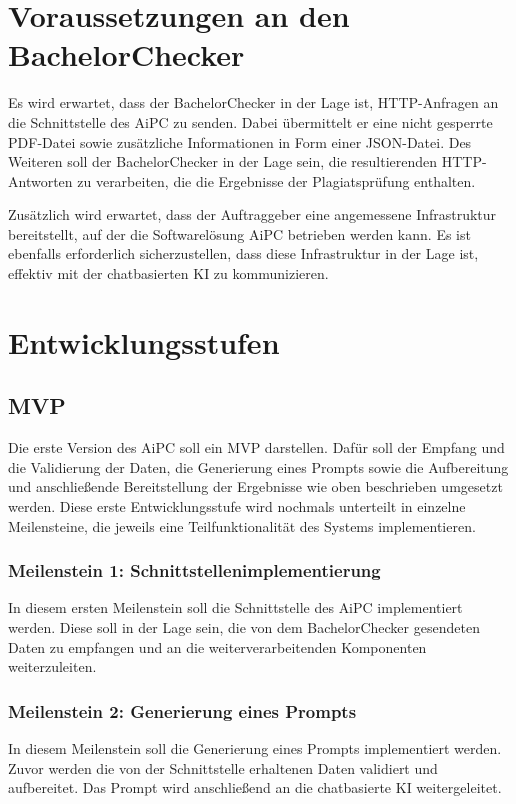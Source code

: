 \section{Voraussetzungen an den BachelorChecker}\label{sec:voraussetzungen-an-den-bachelorchecker}

Es wird erwartet, dass der BachelorChecker in der Lage ist, \ac{HTTP}-Anfragen an die Schnittstelle des \ac{AiPC} zu senden.
Dabei übermittelt er eine nicht gesperrte \ac{PDF}-Datei sowie zusätzliche Informationen in Form einer \ac{JSON}-Datei.
Des Weiteren soll der BachelorChecker in der Lage sein, die resultierenden \ac{HTTP}-Antworten zu verarbeiten, die die Ergebnisse der Plagiatsprüfung enthalten.

Zusätzlich wird erwartet, dass der Auftraggeber eine angemessene Infrastruktur bereitstellt, auf der die Softwarelösung \ac{AiPC} betrieben werden kann.
Es ist ebenfalls erforderlich sicherzustellen, dass diese Infrastruktur in der Lage ist, effektiv mit der chatbasierten \ac{KI} zu kommunizieren.


\section{Entwicklungsstufen}\label{sec:entwicklungsstufen}

\subsection{MVP}\label{subsec:mvp}

Die erste Version des \ac{AiPC} soll ein \ac{MVP} darstellen.
Dafür soll der Empfang und die Validierung der Daten, die Generierung eines Prompts sowie die Aufbereitung und anschließende Bereitstellung der Ergebnisse wie oben beschrieben umgesetzt werden.
Diese erste Entwicklungsstufe wird nochmals unterteilt in einzelne Meilensteine, die jeweils eine Teilfunktionalität des Systems implementieren.

\subsubsection{Meilenstein 1: Schnittstellenimplementierung}
In diesem ersten Meilenstein soll die Schnittstelle des \ac{AiPC} implementiert werden.
Diese soll in der Lage sein, die von dem BachelorChecker gesendeten Daten zu empfangen und an die weiterverarbeitenden Komponenten weiterzuleiten.

\subsubsection{Meilenstein 2: Generierung eines Prompts}
In diesem Meilenstein soll die Generierung eines Prompts implementiert werden.
Zuvor werden die von der Schnittstelle erhaltenen Daten validiert und aufbereitet.
Das Prompt wird anschließend an die chatbasierte \ac{KI} weitergeleitet.

